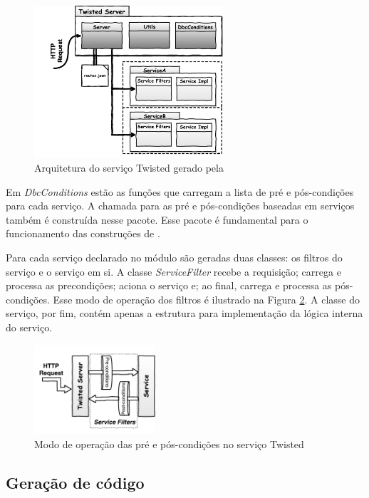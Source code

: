 \begin{figure}[htb]
\centering
\includegraphics[width=70mm,trim = 18mm 4mm 0mm
0mm,clip]{img/TwistedServer.pdf}
\caption{Arquitetura do serviço Twisted gerado pela \neoidl{}}
\label{Fig:TwistedArchtecture}
\end{figure}

Em \emph{DbcConditions} estão as funções que carregam a lista de pré e
pós-condições para cada serviço. A chamada para as pré e pós-condições baseadas
em serviços também é construída nesse pacote. Esse pacote é fundamental para o
funcionamento das cons\-tru\-ções de \designbycontract{}.

Para cada serviço declarado no módulo \neoidl{} são geradas duas classes: os
filtros do serviço e o serviço em si. A classe \emph{ServiceFilter} recebe a
requisição; carrega e processa as precondições; aciona o serviço e; ao final,
carrega e processa as pós-condições. Esse modo de operação dos filtros é
ilustrado na Figura \ref{Fig:TwistedFiltes}. A classe do serviço, por
fim, contém apenas a estrutura para implementação da lógica interna do serviço.

\begin{figure}[!htb]
\centering
\includegraphics[width=45mm,trim = 5mm 6mm 0mm 
3mm,clip]{img/TwistedFilters.pdf}
\caption{Modo de operação das pré e pós-condições no serviço Twisted}
\label{Fig:TwistedFiltes}
\end{figure}

\subsection{Geração de código}

